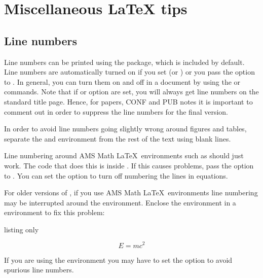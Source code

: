\section{Miscellaneous \LaTeX{} tips}%
\label{sec:latex}

\subsection{Line numbers}

Line numbers can be printed using the  package, 
which is included by default.
Line numbers are automatically turned on if you set  (or )
or you pass the option  to .
In general, you can turn them on and off in a document by using the  or  commands.
Note that if  or option  are set,
you will always get line numbers on the standard title page.
Hence, for papers, CONF and PUB notes it is important to comment out  in order to suppress the line numbers for the final version.

In order to avoid line numbers going slightly wrong around figures and tables,
separate the  and  environment from the rest of the text using blank lines.

 Line numbering around AMS Math \LaTeX\ environments such as 
should just work.
The code that does this is inside .
If this causes problems, pass the option  to .
You can set the option  to turn off numbering the lines in equations.

For older versions of ,
if you use AMS Math \LaTeX\ environments line numbering may be interrupted around the environment.
Enclose the environment in a  environment to fix this problem:
\begin{tcblisting}{listing only}
\begin{linenomath}
\begin{equation*}
  E = m c^{2}
\end{equation*}
\end{linenomath}
\end{tcblisting}
If you are using the environment  you may have to set the option to avoid spurious line numbers.


